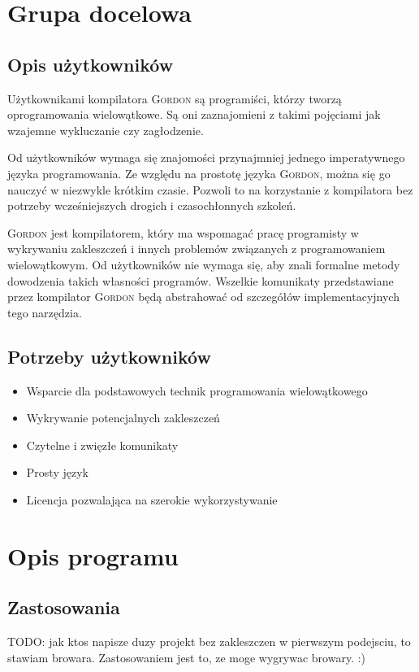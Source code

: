 \documentclass{documentation}
\begin{document}
\section{Grupa docelowa}
\subsection{Opis użytkowników}
\noindent Użytkownikami kompilatora \textsc{Gordon} są programiści, którzy tworzą oprogramowania wielowątkowe. Są oni zaznajomieni z takimi pojęciami jak wzajemne wykluczanie czy zagłodzenie.

Od użytkowników wymaga się znajomości przynajmniej jednego imperatywnego języka programowania. Ze względu na prostotę języka \textsc{Gordon}, można się go nauczyć w niezwykle krótkim czasie. Pozwoli to na korzystanie z kompilatora bez potrzeby wcześniejszych drogich i czasochłonnych szkoleń.

\textsc{Gordon} jest kompilatorem, który ma wspomagać pracę programisty w wykrywaniu zakleszczeń i innych problemów związanych z programowaniem wielowątkowym. Od użytkowników nie wymaga się, aby znali formalne metody dowodzenia takich własności programów. Wszelkie komunikaty przedstawiane przez kompilator \textsc{Gordon} będą abstrahować od szczegółów implementacyjnych tego narzędzia.

\subsection{Potrzeby użytkowników}
\begin{itemize}
\item Wsparcie dla podstawowych technik programowania wielowątkowego
\item Wykrywanie potencjalnych zakleszczeń
\item Czytelne i zwięzłe komunikaty
\item Prosty język
\item Licencja pozwalająca na szerokie wykorzystywanie
\end{itemize}

\section{Opis programu}
\subsection{Zastosowania}
TODO: jak ktos napisze duzy projekt bez zakleszczen w pierwszym podejsciu, to stawiam browara. Zastosowaniem jest to, ze moge wygrywac browary. :)
\end{document}
